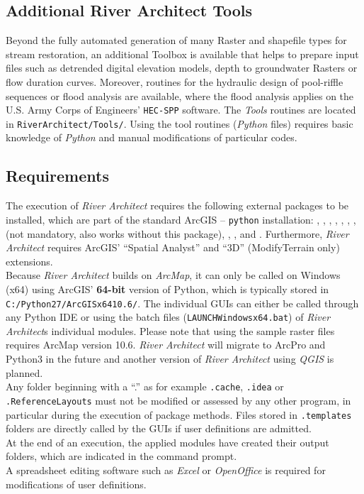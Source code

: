 \subsection{Additional River Architect Tools} \label{sec:tools}
Beyond the fully automated generation of many Raster and shapefile types for stream restoration, an additional Toolbox is available that helps to prepare input files such as detrended digital elevation models, depth to groundwater Rasters or flow duration curves. Moreover, routines for the hydraulic design of pool-riffle sequences or flood analysis are available, where the flood analysis applies on the U.S. Army Corps of Engineers' \texttt{HEC-SPP} software. The \textit{Tools} routines are located in \texttt{RiverArchitect/Tools/}. Using the tool routines (\textit{Python} files) requires basic knowledge of \textit{Python} and manual modifications of particular codes.

\subsection{Requirements}
The execution of \textit{River Architect} requires the following external packages to be installed, which are part of the standard ArcGIS -- \texttt{python} installation: , , , , , , ,  (not mandatory, also works without this package), , , and . Furthermore, \textit{River Architect} requires ArcGIS' ``Spatial Analyst'' and ``3D'' (ModifyTerrain only) extensions.\\
Because \textit{River Architect} builds on \textit{ArcMap}, it can only be called on Windows (x64) using ArcGIS' \textbf{64-bit} version of Python, which is typically stored in \texttt{C:/Python27/ArcGISx6410.6/}. The individual GUIs can either be called through any Python IDE or using the batch files (\texttt{LAUNCH{\myUnderscore}Windows{\myUnderscore}x64.bat}) of \textit{River Architect}s individual modules. Please note that using the sample raster files requires ArcMap version 10.6. \textit{River Architect} will migrate to ArcPro and Python3 in the future and another version of \textit{River Architect} using \textit{QGIS} is planned.\\
Any folder beginning with a ``.'' as for example \texttt{.cache}, \texttt{.idea} or \texttt{.ReferenceLayouts} must not be modified or assessed by any other program, in particular during the execution of package methods. Files stored in \texttt{.templates} folders are directly called by the GUIs if user definitions are admitted.\\
At the end of an execution, the applied modules have created their output folders, which are indicated in the command prompt.\\
A spreadsheet editing software such as \textit{Excel} or \textit{OpenOffice} is required for modifications of user definitions.


